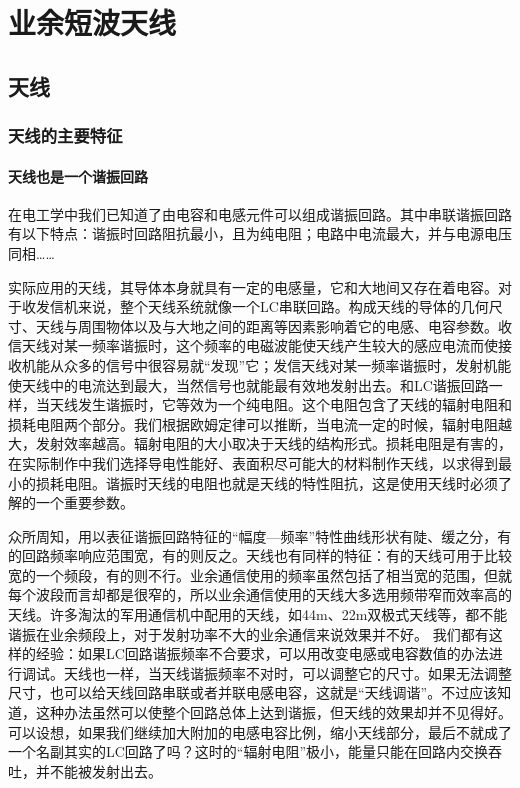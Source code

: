 \documentclass[12pt,UTF8]{ctexbook}
\begin{document}
\chapter{业余短波天线}

\section{天线}

\subsection{天线的主要特征}

\subsubsection{天线也是一个谐振回路}

在电工学中我们已知道了由电容和电感元件可以组成谐振回路。其中串联谐振回路有以下特点：谐振时回路阻抗最小，且为纯电阻；电路中电流最大，并与电源电压同相……

实际应用的天线，其导体本身就具有一定的电感量，它和大地间又存在着电容。对于收发信机来说，整个天线系统就像一个LC串联回路。构成天线的导体的几何尺寸、天线与周围物体以及与大地之间的距离等因素影响着它的电感、电容参数。收信天线对某一频率谐振时，这个频率的电磁波能使天线产生较大的感应电流而使接收机能从众多的信号中很容易就“发现”它；发信天线对某一频率谐振时，发射机能使天线中的电流达到最大，当然信号也就能最有效地发射出去。和LC谐振回路一样，当天线发生谐振时，它等效为一个纯电阻。这个电阻包含了天线的辐射电阻和损耗电阻两个部分。我们根据欧姆定律可以推断，当电流一定的时候，辐射电阻越大，发射效率越高。辐射电阻的大小取决于天线的结构形式。损耗电阻是有害的，在实际制作中我们选择导电性能好、表面积尽可能大的材料制作天线，以求得到最小的损耗电阻。谐振时天线的电阻也就是天线的特性阻抗，这是使用天线时必须了解的一个重要参数。

众所周知，用以表征谐振回路特征的“幅度—频率”特性曲线形状有陡、缓之分，有的回路频率响应范围宽，有的则反之。天线也有同样的特征：有的天线可用于比较宽的一个频段，有的则不行。业余通信使用的频率虽然包括了相当宽的范围，但就每个波段而言却都是很窄的，所以业余通信使用的天线大多选用频带窄而效率高的天线。许多淘汰的军用通信机中配用的天线，如44m、22m双极式天线等，都不能谐振在业余频段上，对于发射功率不大的业余通信来说效果并不好。
我们都有这样的经验：如果LC回路谐振频率不合要求，可以用改变电感或电容数值的办法进行调试。天线也一样，当天线谐振频率不对时，可以调整它的尺寸。如果无法调整尺寸，也可以给天线回路串联或者并联电感电容，这就是“天线调谐”。不过应该知道，这种办法虽然可以使整个回路总体上达到谐振，但天线的效果却并不见得好。可以设想，如果我们继续加大附加的电感电容比例，缩小天线部分，最后不就成了一个名副其实的LC回路了吗？这时的“辐射电阻”极小，能量只能在回路内交换吞吐，并不能被发射出去。
\end{document}
